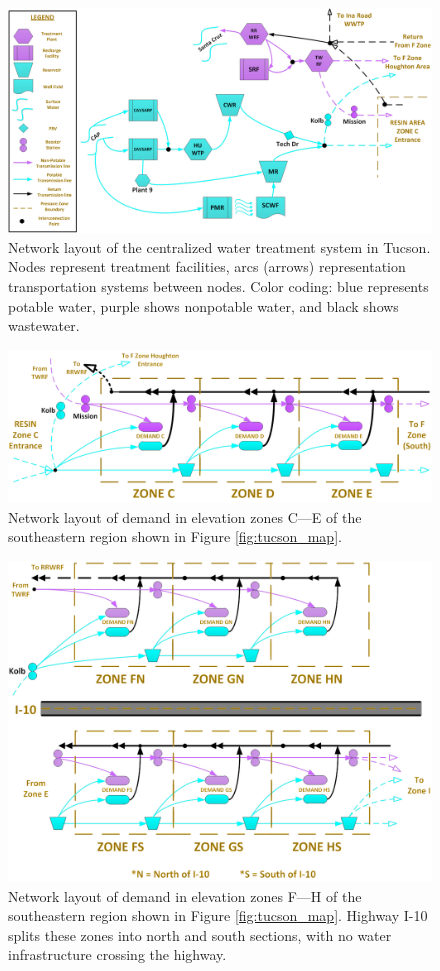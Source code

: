\documentclass[12pt]{amsart}
\begin{document}
\begin{figure}[!ht]
	\centering
	\includegraphics[width=.8\textwidth]{images/nodes_central}
	\caption{
		Network layout of the centralized water treatment system in Tucson.
		Nodes represent treatment facilities, arcs (arrows) representation transportation systems between nodes.
		Color coding: blue represents potable water, purple shows nonpotable water, and black shows wastewater.
	}
	\label{fig:nodes_central}
\end{figure}

\begin{figure}[!ht]
	\centering
	\includegraphics[width=.8\textwidth]{images/zones_c_e}
	\caption{
		Network layout of demand in elevation zones C---E of the southeastern region shown in Figure \ref{fig:tucson_map}.
	}
	\label{fig:zones_c_e}
\end{figure}

\begin{figure}[!ht]
	\centering
	\includegraphics[width=.8\textwidth]{images/zones_split}
	\caption{
		Network layout of demand in elevation zones F---H of the southeastern region shown in Figure \ref{fig:tucson_map}.
		Highway I-10 splits these zones into north and south sections, with no water infrastructure crossing the highway.
	}
	\label{fig:zones_split}
\end{figure}
\end{document}
